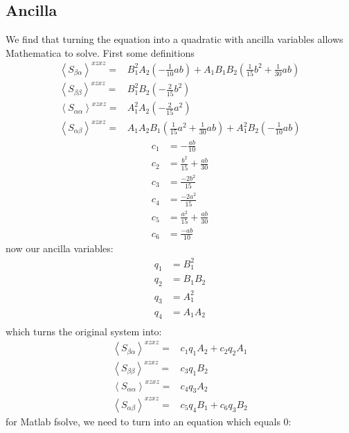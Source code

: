 \subsection{Ancilla}
We find that turning the equation into a quadratic with ancilla variables allows Mathematica to solve.  First some definitions
\begin{align*}
	\left \langle S_{\beta \alpha} \right \rangle^{xzxz} =&   B_1^2 A_2  \left(  -\frac{1}{10}  a b \right)   + A_1 B_1 B_2  \left(  \frac{1}{15}   b^2+ \frac{1}{30}  a b \right) \\
	\left \langle S_{\beta \beta} \right \rangle^{xzxz} =&  B_1^2 B_2  \left(  -\frac{2}{15}  b^2 \right) \\
	\left \langle S_{\alpha \alpha} \right \rangle^{xzxz} =& A_1^2 A_2  \left( - \frac{2}{15}  a^2 \right)  \\
	\left \langle S_{\alpha \beta} \right \rangle^{xzxz} =&   A_1 A_2 B_1 \left( \frac{1}{15}  a^2   + \frac{1}{30}  a b \right)  + A_1^2 B_2   \left( -\frac{1}{10} a b   \right)
\end{align*}
\begin{align}
	c_1 &= -\frac{a b}{10} \\
	c_2 &= \frac{b^2}{15} + \frac{a b}{30} \\
	c_3 &= \frac{-2 b^2}{15} \\
	c_4 &= \frac{-2 a^2}{15} \\
	c_5 &= \frac{a^2}{15} + \frac{a b}{30} \\
	c_6 &= \frac{-a b}{10}
\end{align}
now our ancilla variables:
\begin{align}
	q_1 &= B_1^2 \\
	q_2 &= B_1 B_2 \\
	q_3 &= A_1^2 \\
	q_4 &= A_1 A_2 \\
\end{align}
which turns the original system into:
\begin{align*}
	\left \langle S_{\beta \alpha} \right \rangle^{xzxz} =&   c_1  q_1 A_2  + c_2 q_2  A_1 \\
	\left \langle S_{\beta \beta} \right \rangle^{xzxz} =&   c_3 q_1 B_2  \\
	\left \langle S_{\alpha \alpha} \right \rangle^{xzxz} =&   c_4 q_3 A_2 \\
	\left \langle S_{\alpha \beta} \right \rangle^{xzxz} =&    c_5 q_4 B_1 +  c_6 q_3 B_2
\end{align*}
for Matlab fsolve, we need to turn into an equation which equals 0:
